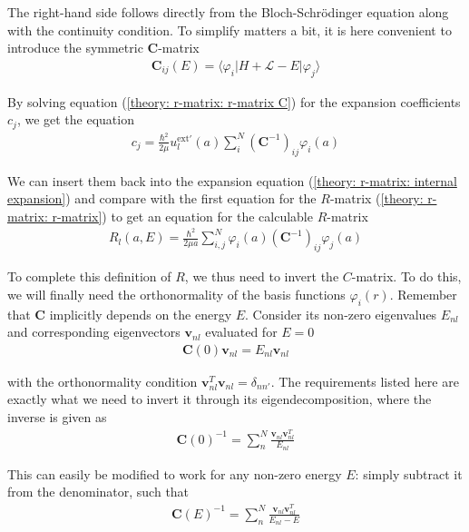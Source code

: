 The right-hand side follows directly from the Bloch-Schrödinger equation along with the continuity condition. To simplify matters a bit, it is here convenient to introduce the symmetric $\bm{C}$-matrix
\begin{align*}
	\bm{C}_{ij}(E) = \langle \varphi_i | H + \mathcal{L} - E | \varphi_j \rangle
\end{align*}

By solving equation (\ref{theory: r-matrix: r-matrix C}) for the expansion coefficients $c_j$, we get the equation
\begin{align*}
	c_j = \frac{\hbar^2}{2\mu}u_l^{\text{ext}\prime}(a)\sum_{i}^{N}(\bm{C}^{-1})_{ij}\varphi_i(a)
\end{align*}

We can insert them back into the expansion equation (\ref{theory: r-matrix: internal expansion}) and compare with the first equation for the $R$-matrix (\ref{theory: r-matrix: r-matrix}) to get an equation for the calculable $R$-matrix
\begin{align} \label{theory: r-matrix: r-matrix intermediate step}
	R_l(a, E) = \frac{\hbar^2}{2\mu a}\sum_{i, j}^{N}\varphi_i(a)(\bm{C}^{-1})_{ij}\varphi_j(a)
\end{align}

To complete this definition of $R$, we thus need to invert the $C$-matrix. To do this, we will finally need the orthonormality of the basis functions $\varphi_i(r)$. Remember that $\bm{C}$ implicitly depends on the energy $E$. Consider its non-zero eigenvalues $E_{nl}$ and corresponding eigenvectors $\bm{v}_{nl}$ evaluated for $E = 0$
\begin{align*}
	\bm{C}(0)\bm{v}_{nl} = E_{nl}\bm{v}_{nl}
\end{align*}

with the orthonormality condition $\bm{v}_{nl}^T \bm{v}_{nl} = \delta_{nn'}$. The requirements listed here are exactly what we need to invert it through its eigendecomposition, where the inverse is given as
\begin{align*}
	\bm{C}(0)^{-1} = \sum_n^N \frac{\bm{v}_{nl}\bm{v}_{nl}^T}{E_{nl}}
\end{align*}

This can easily be modified to work for any non-zero energy $E$: simply subtract it from the denominator, such that
\begin{align} \label{theory: r-matrix: C-inverse}
	\bm{C}(E)^{-1} = \sum_n^N \frac{\bm{v}_{nl}\bm{v}_{nl}^T}{E_{nl} - E}
\end{align}


